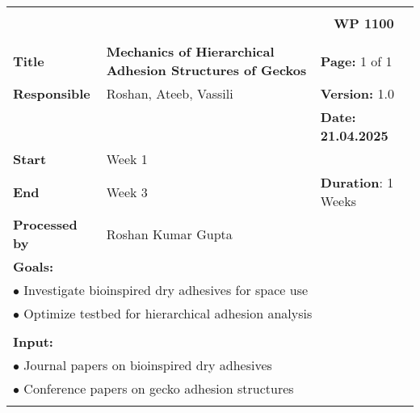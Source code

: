 \begin{table}[!h]
    \begin{center}
        \begin{tabular}{|p{}||p{}|p{}||p{}|}
            \hline
            \multicolumn{3}{|l||}{\textbf{}} & \multicolumn{1}{c|}{}\\
            \multicolumn{3}{|l||}{\textbf{}} & \multicolumn{1}{c|}{\textbf{WP 1100}}\\
            \multicolumn{3}{|l||}{\textbf{}} & \multicolumn{1}{c|}{}\\
            \hline\hline
            \textbf{Title} & \multicolumn{2}{p{.40\columnwidth}||}{\textbf{Mechanics of Hierarchical Adhesion Structures of Geckos}}
            & \textbf{Page:} 1 of 1\\
            \hline
            \textbf{Responsible} & \multicolumn{2}{l||}{Roshan, Ateeb, Vassili} & \textbf{Version:} 1.0\\
            \hline
            \multicolumn{3}{|l||}{} & \textbf{Date: 21.04.2025} \\
            \hline\hline
            \textbf{Start} & \multicolumn{2}{l||}{Week 1} & \\
            \hline
            \textbf{End} & \multicolumn{2}{l||}{Week 3} & \textbf{Duration}: 1 Weeks\\
            \hline\hline
            \textbf{Processed by} & \multicolumn{3}{l|}{Roshan Kumar Gupta}\\
            \hline\hline
            \multicolumn{4}{|p{.95\columnwidth}|}{\textbf{Goals:}}\\
            \multicolumn{4}{|p{.95\columnwidth}|}{$\bullet$ Investigate bioinspired dry adhesives for space use}\\
            \multicolumn{4}{|p{.95\columnwidth}|}{$\bullet$ Optimize testbed for hierarchical adhesion analysis}\\
            \multicolumn{4}{|p{.95\columnwidth}|}{}\\
            \multicolumn{4}{|p{.95\columnwidth}|}{\textbf{Input:}}\\
            \multicolumn{4}{|p{.95\columnwidth}|}{$\bullet$ Journal papers on bioinspired dry adhesives}\\
            \multicolumn{4}{|p{.95\columnwidth}|}{$\bullet$ Conference papers on gecko adhesion structures}\\
            \multicolumn{4}{|p{.95\columnwidth}|}{}\\

\end{tabular}
\end{center}
\end{table}
